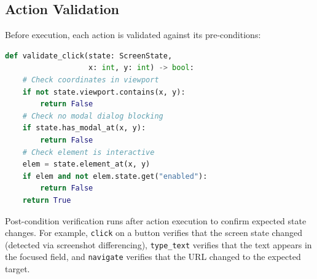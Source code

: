 \subsection{Action Validation}

Before execution, each action is validated against its pre-conditions:

\begin{lstlisting}[language=Python, caption=Pre-condition validation]
def validate_click(state: ScreenState,
                   x: int, y: int) -> bool:
    # Check coordinates in viewport
    if not state.viewport.contains(x, y):
        return False
    # Check no modal dialog blocking
    if state.has_modal_at(x, y):
        return False
    # Check element is interactive
    elem = state.element_at(x, y)
    if elem and not elem.state.get("enabled"):
        return False
    return True
\end{lstlisting}

Post-condition verification runs after action execution to confirm expected state changes. For example, \texttt{click} on a button verifies that the screen state changed (detected via screenshot differencing), \texttt{type\_text} verifies that the text appears in the focused field, and \texttt{navigate} verifies that the URL changed to the expected target.

